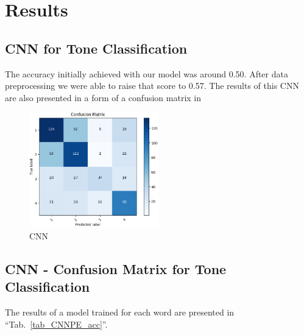 \documentclass[conference]{IEEEtran}
\begin{document}
\section{Results}

\subsection{CNN for Tone Classification}

The accuracy initially achieved with our model was around 0.50. After data preprocessing we were able to raise that score to 0.57.
The results of this CNN are also presented in a form of a confusion matrix in 

\begin{figure}[hbtp]
    \centerline{\includegraphics[width=0.5\textwidth]{Figures/ToneCNN_Matrix.png}}
    \caption{CNN }
    \label{fig_ToneCNN_Mat} %
    \end{figure}

\subsection{CNN - Confusion Matrix for Tone Classification}

The results of a model trained for each word are presented in ``Tab.~\ref{tab_CNNPE_acc}''.
\end{document}
